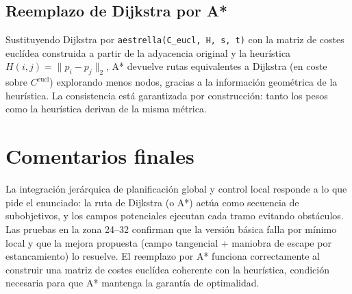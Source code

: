 \subsection{Reemplazo de Dijkstra por A*}
Sustituyendo Dijkstra por \texttt{aestrella(C\_eucl, H, s, t)} con la matriz de costes eucl\'{i}dea construida a partir de la adyacencia original y la heur\'{i}stica $H(i,j) = \lVert p_i - p_j\rVert_2$, A* devuelve rutas equivalentes a Dijkstra (en coste sobre $C^{\text{eucl}}$) explorando menos nodos, gracias a la informaci\'{o}n geom\'{e}trica de la heur\'{i}stica. La consistencia est\'{a} garantizada por construcci\'{o}n: tanto los pesos como la heur\'{i}stica derivan de la misma m\'{e}trica.


\section{Comentarios finales}

La integraci\'{o}n jer\'{a}rquica de planificaci\'{o}n global y control local responde a lo que pide el enunciado: la ruta de Dijkstra (o A*) act\'{u}a como secuencia de subobjetivos, y los campos potenciales ejecutan cada tramo evitando obst\'{a}culos. Las pruebas en la zona 24--32 confirman que la versi\'{o}n b\'{a}sica falla por m\'{i}nimo local y que la mejora propuesta (campo tangencial + maniobra de escape por estancamiento) lo resuelve. El reemplazo por A* funciona correctamente al construir una matriz de costes eucl\'{i}dea coherente con la heur\'{i}stica, condici\'{o}n necesaria para que A* mantenga la garant\'{i}a de optimalidad.
